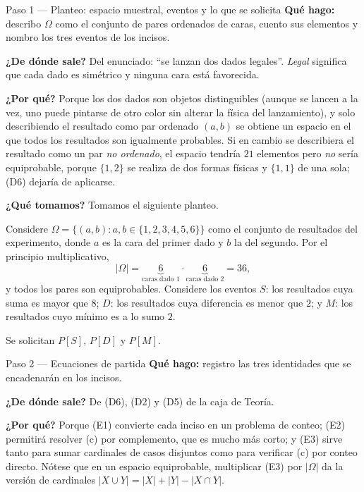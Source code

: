 \documentclass[11pt]{article}
\begin{document}
\begin{sol}

\begin{paso}{Paso 1 --- Planteo: espacio muestral, eventos y lo que se solicita}
\textbf{Qué hago:} describo $\Omega$ como el conjunto de pares ordenados de caras, cuento sus
elementos y nombro los tres eventos de los incisos.

\textbf{¿De dónde sale?} Del enunciado: ``se lanzan dos dados legales''. \emph{Legal} significa
que cada dado es simétrico y ninguna cara está favorecida.

\textbf{¿Por qué?} Porque los dos dados son objetos distinguibles (aunque se lancen a la vez,
uno puede pintarse de otro color sin alterar la física del lanzamiento), y solo describiendo el
resultado como par ordenado $(a,b)$ se obtiene un espacio en el que todos los resultados son
igualmente probables. Si en cambio se describiera el resultado como un par \emph{no ordenado},
el espacio tendría $21$ elementos pero \emph{no} sería equiprobable, porque $\{1,2\}$ se realiza
de dos formas físicas y $\{1,1\}$ de una sola; (D6) dejaría de aplicarse.

\textbf{¿Qué tomamos?} Tomamos el siguiente planteo.

\medskip
Considere $\Omega=\{(a,b): a,b\in\{1,2,3,4,5,6\}\}$ como el conjunto de resultados del
experimento, donde $a$ es la cara del primer dado y $b$ la del segundo. Por el principio
multiplicativo,
\[
|\Omega|=\underbrace{6}_{\text{caras dado }1}\cdot\underbrace{6}_{\text{caras dado }2}=36 ,
\]
y todos los pares son equiprobables. Considere los eventos $S$: los resultados cuya suma es
mayor que $8$; $D$: los resultados cuya diferencia es menor que $2$; y $M$: los resultados cuyo
mínimo es a lo sumo $2$.

Se solicitan $P[S]$, $P[D]$ y $P[M]$.
\end{paso}

\begin{paso}{Paso 2 --- Ecuaciones de partida}
\textbf{Qué hago:} registro las tres identidades que se encadenarán en los incisos.

\textbf{¿De dónde sale?} De (D6), (D2) y (D5) de la caja de Teoría.

\textbf{¿Por qué?} Porque (E1) convierte cada inciso en un problema de conteo; (E2) permitirá
resolver (c) por complemento, que es mucho más corto; y (E3) sirve tanto para sumar cardinales
de casos disjuntos como para verificar (c) por conteo directo. Nótese que en un espacio
equiprobable, multiplicar (E3) por $|\Omega|$ da la versión de cardinales
$|X\cup Y|=|X|+|Y|-|X\cap Y|$.


\end{paso}
\end{sol}
\end{document}
